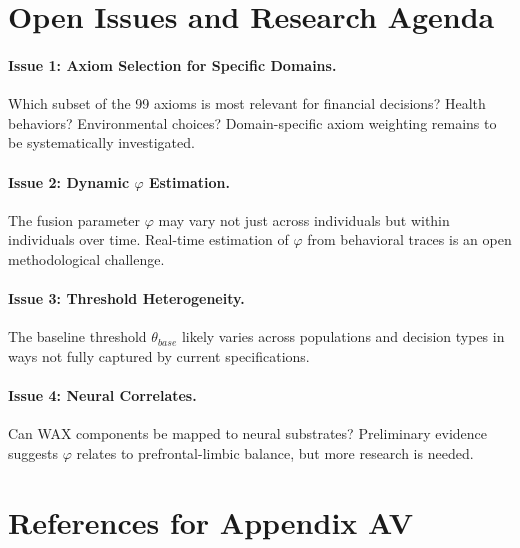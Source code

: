 
\section{Open Issues and Research Agenda}
\label{sec:av-openissues}

\paragraph{Issue 1: Axiom Selection for Specific Domains.}
Which subset of the 99 axioms is most relevant for financial decisions?
Health behaviors? Environmental choices? Domain-specific axiom weighting
remains to be systematically investigated.

\paragraph{Issue 2: Dynamic $\varphi$ Estimation.}
The fusion parameter $\varphi$ may vary not just across individuals but
within individuals over time. Real-time estimation of $\varphi$ from
behavioral traces is an open methodological challenge.

\paragraph{Issue 3: Threshold Heterogeneity.}
The baseline threshold $\theta_{base}$ likely varies across populations
and decision types in ways not fully captured by current specifications.

\paragraph{Issue 4: Neural Correlates.}
Can WAX components be mapped to neural substrates? Preliminary evidence
suggests $\varphi$ relates to prefrontal-limbic balance, but more research
is needed.


\section{References for Appendix AV}
\label{sec:av-references}

